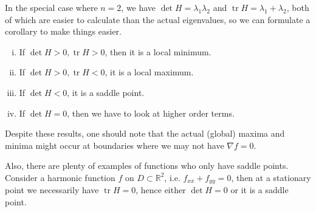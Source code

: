 \documentclass[a4paper]{article}
\begin{document}
In the special case where $n=2$, we have $\det H=\lambda_1\lambda_2$ and $\operatorname{tr} H=\lambda_1+\lambda_2$, both of which are easier to calculate than the actual eigenvalues, so we can formulate a corollary to make things easier.
\begin{corollary}
    \begin{enumerate}[(i)]
        \item If $\det H>0,\operatorname{tr}H>0$, then it is a local minimum.
        \item If $\det H>0,\operatorname{tr}H<0$, it is a local maximum.
        \item If $\det H<0$, it is a saddle point.
        \item If $ \det H=0 $, then we have to look at higher order terms.
    \end{enumerate}
\end{corollary}
Despite these results, one should note that the actual (global) maxima and minima might occur at boundaries where we may not have $\nabla f=0$.

Also, there are plenty of examples of functions who only have saddle points.
Consider a harmonic function $f$ on $D\subset\mathbb R^2$, i.e. $f_{xx}+f_{yy}=0$, then at a stationary point we necessarily have $\operatorname{tr}H=0$, hence either $\det H=0$ or it is a saddle point.
\end{document}
